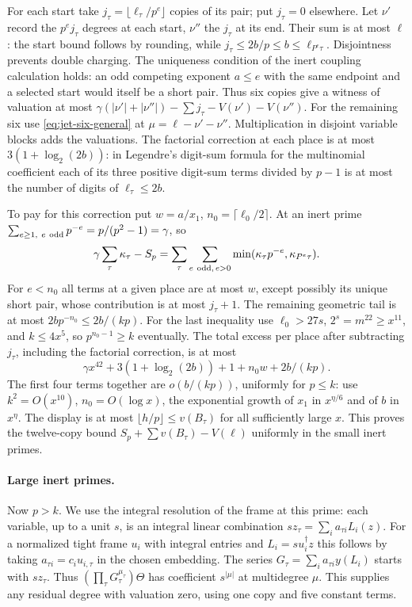 For each start take $j_\tau=\lfloor\ell_\tau/p^e\rfloor$ copies of its
pair; put $j_\tau=0$ elsewhere. Let $\nu'$ record the $p^ej_\tau$
degrees at each start, $\nu''$ the $j_\tau$ at its end. Their sum is
at most $\ell$: the start bound follows by rounding, while
$j_\tau\le 2b/p\le b\le\ell_{P^e\tau}$. Disjointness prevents
double charging. The uniqueness condition of the inert coupling
calculation holds: an odd competing exponent $a\le e$ with the
same endpoint and a selected start would itself be a short pair.
Thus six copies give a witness of valuation at most
$\gamma(|\nu'|+|\nu''|)-\sum j_\tau-V(\nu')-V(\nu'')$.
For the remaining six use \eqref{eq:jet-six-general} at
$\mu=\ell-\nu'-\nu''$. Multiplication in disjoint variable blocks
adds the valuations. The factorial correction at each place is at
most $3(1+\log_2(2b))$: in Legendre's digit-sum formula for the
multinomial coefficient each of its three positive digit-sum terms
divided by $p-1$ is at most the number of digits of $\ell_\tau\le2b$.

To pay for this correction put $w=a/x_1$,
$n_0=\lceil\ell_0/2\rceil$. At an inert prime
$\sum_{e\ge1,\ e\ {\rm odd}}p^{-e}=p/(p^2-1)=\gamma$, so
\[
 \gamma\sum_\tau\kappa_\tau-S_p
 =\sum_\tau\sum_{e\ {\rm odd},\,e>0}
                 \min(\kappa_\tau p^{-e},\kappa_{P^e\tau}).
\]
For $e<n_0$ all terms at a given place are at most $w$, except
possibly its unique short pair, whose contribution is at most
$j_\tau+1$. The remaining geometric tail is at most
$2b p^{-n_0}\le2b/(kp)$. For the last inequality use
$\ell_0>27s$, $2^s=m^{22}\ge x^{11}$, and $k\le 4x^5$,
so $p^{n_0-1}\ge k$ eventually. The total excess per place after
subtracting $j_\tau$, including the factorial correction, is at most
\[
 \gamma x^{42}+3(1+\log_2(2b))+1+n_0 w+2b/(kp).
\]
The first four terms together are $o(b/(kp))$, uniformly for
$p\le k$: use $k^2=O(x^{10})$, $n_0=O(\log x)$, the
exponential growth of $x_1$ in $x^{\eta/6}$ and of $b$ in $x^\eta$.
The display is at most $\lfloor h/p\rfloor\le v(B_\tau)$ for all
sufficiently large $x$. This proves the twelve-copy bound
$S_p+\sum v(B_\tau)-V(\ell)$ uniformly in the small inert primes.

\paragraph{Large inert primes.}
Now $p>k$. We use the integral resolution of the frame at this prime:
each variable, up to a unit $s$, is an integral linear combination
$sz_\tau=\sum_i a_{\tau i}L_i(z)$. For a normalized tight frame
$u_i$ with integral entries and $L_i=s u_i^\dagger z$ this follows
by taking $a_{\tau i}=c_i u_{i,\tau}$ in the chosen embedding.
The series $G_\tau=\sum_i a_{\tau i}y(L_i)$ starts with $sz_\tau$.
Thus $(\prod_\tau G_\tau^{\mu_\tau})\Theta$ has coefficient $s^{|\mu|}$
at multidegree $\mu$. This supplies any residual degree with valuation
zero, using one copy and five constant terms.


